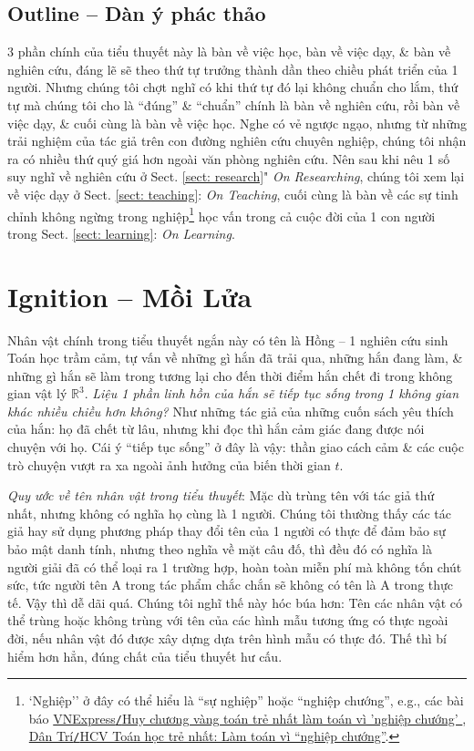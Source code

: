 \documentclass[12pt]{article}
\begin{document}
\subsection{Outline -- Dàn ý phác thảo}
3 phần chính của tiểu thuyết này là bàn về việc học, bàn về việc dạy, \& bàn về nghiên cứu, đáng lẽ sẽ theo thứ tự trưởng thành dần theo chiều phát triển của 1 người. Nhưng chúng tôi chợt nghĩ có khi thứ tự đó lại không chuẩn cho lắm, thứ tự mà chúng tôi cho là ``đúng'' \& ``chuẩn'' chính là bàn về nghiên cứu, rồi bàn về việc dạy, \& cuối cùng là bàn về việc học. Nghe có vẻ ngược ngạo, nhưng từ những trải nghiệm của tác giả trên con đường nghiên cứu chuyên nghiệp, chúng tôi nhận ra có nhiều thứ quý giá hơn ngoài văn phòng nghiên cứu. Nên sau khi nêu 1 số suy nghĩ về nghiên cứu ở Sect. \ref{sect: research}" {\it On Researching}, chúng tôi xem lại về việc dạy ở Sect. \ref{sect: teaching}: {\it On Teaching}, cuối cùng là bàn về các sự tinh chỉnh không ngừng trong nghiệp\footnote{`Nghiệp'' ở đây có thể hiểu là ``sự nghiệp'' hoặc ``nghiệp chướng'', e.g., các bài báo \href{https://vnexpress.net/huy-chuong-vang-toan-tre-nhat-lam-toan-vi-nghiep-chuong-2393718.html}{VNExpress{\tt/}Huy chương vàng toán trẻ nhất làm toán vì 'nghiệp chướng' }, \href{https://dantri.com.vn/giao-duc/hcv-toan-hoc-tre-nhat-lam-toan-vi-nghiep-chuong-1354447180.htm}{Dân Trí{\tt/}HCV Toán học trẻ nhất: Làm toán vì ``nghiệp chướng''}.} học vấn trong cả cuộc đời của 1 con người trong Sect. \ref{sect: learning}: {\it On Learning}.

\section{Ignition -- Mồi Lửa}
Nhân vật chính trong tiểu thuyết ngắn này có tên là Hồng -- 1 nghiên cứu sinh Toán học trầm cảm, tự vấn về những gì hắn đã trải qua, những hắn đang làm, \& những gì hắn sẽ làm trong tương lại cho đến thời điểm hắn chết đi trong không gian vật lý $\mathbb{R}^3$. {\it Liệu 1 phần linh hồn của hắn sẽ tiếp tục sống trong 1 không gian khác nhiều chiều hơn không?} Như những tác giả của những cuốn sách yêu thích của hắn: họ đã chết từ lâu, nhưng khi đọc thì hắn cảm giác đang được nói chuyện với họ. Cái ý ``tiếp tục sống'' ở đây là vậy: thần giao cách cảm \& các cuộc trò chuyện vượt ra xa ngoài ảnh hưởng của biến thời gian $t$.

{\it Quy ước về tên nhân vật trong tiểu thuyết}: Mặc dù trùng tên với tác giả thứ nhất, nhưng không có nghĩa họ cùng là 1 người. Chúng tôi thường thấy các tác giả hay sử dụng phương pháp thay đổi tên của 1 người có thực để đảm bảo sự bảo mật danh tính, nhưng theo nghĩa về mặt câu đố, thì đều đó có nghĩa là người giải đã có thể loại ra 1 trường hợp, hoàn toàn miễn phí mà không tốn chút sức, tức người tên A trong tác phẩm chắc chắn sẽ không có tên là A trong thực tế. Vậy thì dễ dãi quá. Chúng tôi nghĩ thế này hóc búa hơn: Tên các nhân vật có thể trùng hoặc không trùng với tên của các hình mẫu tương ứng có thực ngoài đời, nếu nhân vật đó được xây dựng dựa trên hình mẫu có thực đó. Thế thì bí hiểm hơn hẳn, đúng chất của tiểu thuyết hư cấu.
\end{document}
